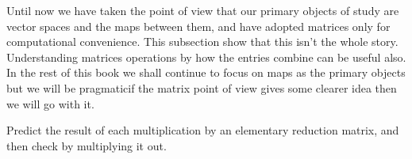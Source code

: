 Until now we have taken the point of view that our primary objects of study
are vector spaces and the maps between them, and
have adopted matrices only for computational convenience.
This subsection show that this isn't the whole story.
Understanding matrices operations by how the entries combine can
be useful also. 
In the rest of this book we shall continue to focus on maps as the primary
objects but we will be pragmatic\Dash if the matrix point of view gives some
clearer idea then we will go with it.


\begin{exercises}
  \recommended \item
    Predict the result of each multiplication by an elementary
    reduction matrix, and then check by multiplying it out.
\end{exercises}

